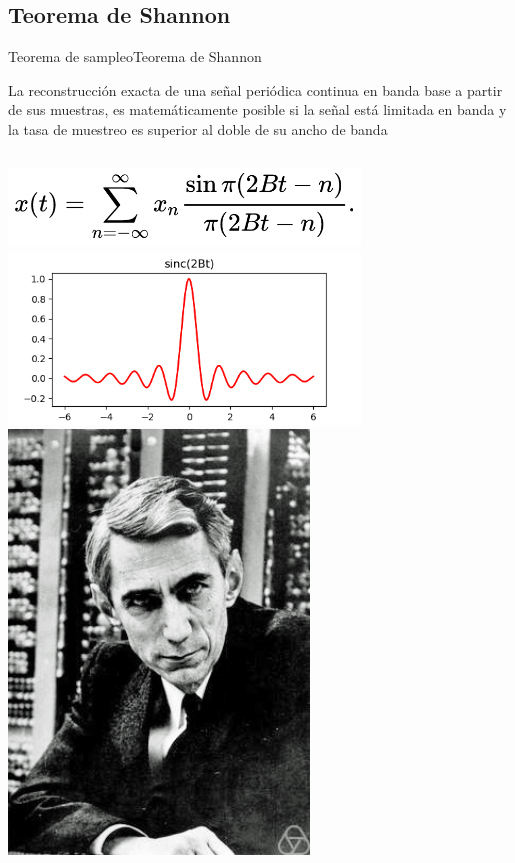  \subsection{Teorema de Shannon}
 \begin{frame}{Teorema de sampleo}{Teorema de Shannon}
    \begin{teorema}
       La reconstrucción exacta de una señal periódica continua en banda base a partir de sus muestras, es matemáticamente posible si la señal está limitada en banda y la tasa de muestreo es superior al doble de su ancho de banda
    \end{teorema}
    \begin{columns}[onlytextwidth]
       \center\includegraphics[width=0.7\textwidth]{1_clase/shannon} \\
       \center\includegraphics[width=0.7\textwidth]{1_clase/sinc_limpia}
       \center\includegraphics[width=0.6\textwidth]{1_clase/claude_shannon}
    \end{columns}
    \vfill
 \end{frame}
